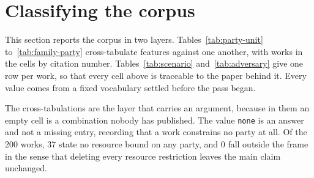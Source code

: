 \section{Classifying the corpus}
\label{sec:tables}

This section reports the corpus in two layers. Tables~\ref{tab:party-unit} to~\ref{tab:family-party} cross-tabulate features against one another, with works in the cells by citation number. Tables~\ref{tab:scenario} and~\ref{tab:adversary} give one row per work, so that every cell above is traceable to the paper behind it. Every value comes from a fixed vocabulary settled before the pass began.

The cross-tabulations are the layer that carries an argument, because in them an empty cell is a combination nobody has published. The value \texttt{none} is an answer and not a missing entry, recording that a work constrains no party at all. Of the 200 works, 37 state no resource bound on any party, and 0 fall outside the frame in the sense that deleting every resource restriction leaves the main claim unchanged.


